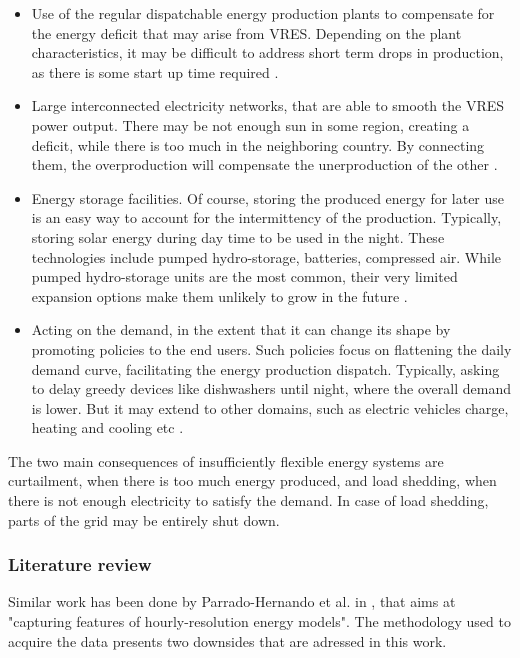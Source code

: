 \begin{itemize}
    \item Use of the regular dispatchable energy production plants to compensate for the energy deficit that may arise from VRES. Depending on the plant characteristics, it may be difficult to address short term drops in production, as there is some start up time required \cite{flexibility-storage-planning}.
    \item Large interconnected electricity networks, that are able to smooth the VRES power output. There may be not enough sun in some region, creating a deficit, while there is too much in the neighboring country. By connecting them, the overproduction will compensate the unerproduction of the other \cite{flexibility-connection}.
    \item Energy storage facilities. Of course, storing the produced energy for later use is an easy way to account for the intermittency of the production. Typically, storing solar energy during day time to be used in the night. These technologies include pumped hydro-storage, batteries, compressed air. While pumped hydro-storage units are the most common, their very limited expansion options make them unlikely to grow in the future \cite{flexibility-demdandside-forecasts-storage}.
    \item Acting on the demand, in the extent that it can change its shape by promoting policies to the end users. Such policies focus on flattening the daily demand curve, facilitating the energy production dispatch. Typically, asking to delay greedy devices like dishwashers until night, where the overall demand is lower. But it may extend to other domains, such as electric vehicles charge, heating and cooling etc \cite{flexibility-demdandside-forecasts-storage}.
\end{itemize}

The two main consequences of insufficiently flexible energy systems are curtailment, when there is too much energy produced, and load shedding, when there is not enough electricity to satisfy the demand. In case of load shedding, parts of the grid may be entirely shut down.

\subsubsection{Literature review}

Similar work has been done by Parrado-Hernando et al. in \cite{Hernando2022}, that aims at "capturing features of hourly-resolution energy models". The methodology used to acquire the data presents two downsides that are adressed in this work.

